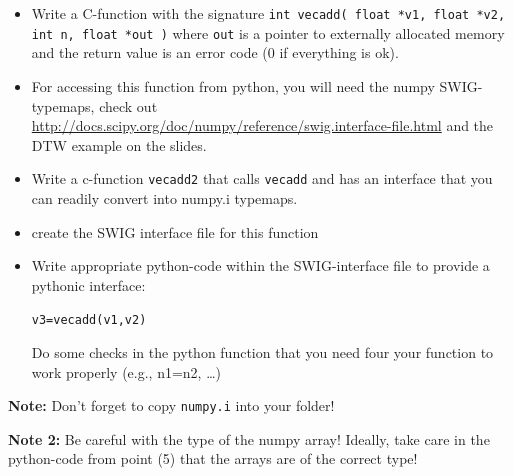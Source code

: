 \documentclass[12pt]{scrartcl}
\begin{document}
\begin{itemize}
\item Write a C-function with the signature {\tt int vecadd( float
  *v1, float *v2, int n, float *out )} where {\tt out} is a pointer to
  externally allocated memory and the return value is an error code (0
  if everything is ok). 
\item For accessing this function from python, you will need the numpy
  SWIG-typemaps, check out
  \url{http://docs.scipy.org/doc/numpy/reference/swig.interface-file.html}
  and the DTW example on the slides.
\item Write a c-function {\tt vecadd2} that calls {\tt vecadd} and has
  an interface that you can readily convert into numpy.i typemaps.
\item create the SWIG interface file for this function
\item Write appropriate python-code within the SWIG-interface file to
  provide a pythonic interface:
  
  {\tt v3=vecadd(v1,v2)}

  Do some checks in the python function that you need four your
  function to work properly (e.g., n1=n2, \ldots)
\end{itemize}

{\bf Note:} Don't forget to copy {\tt numpy.i} into your folder!

{\bf Note 2:} Be careful with the type of the numpy array! Ideally,
take care in the python-code from point (5) that the arrays are of the correct type!
\end{document}
